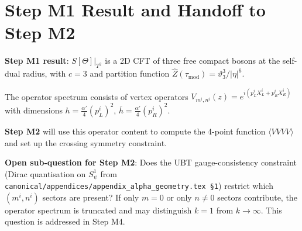 \documentclass[12pt,a4paper]{article}
\theoremstyle{definition}
\theoremstyle{remark}
\begin{document}
\section{Step M1 Result and Handoff to Step M2}
\label{sec:m1:result}

\begin{resultbox}
\textbf{Step M1 result}: $S[\Theta]|_{T^2}$ is a 2D CFT of three free compact
bosons at the self-dual radius, with $c = 3$ and partition function
$\hat{Z}(\tau_{\mathrm{mod}}) = \vartheta_3^3 / |\eta|^6$.

The operator spectrum consists of vertex operators
$V_{m^i,n^i}(z) = e^{i(p^i_L X^i_L + p^i_R X^i_R)}$
with dimensions $h = \frac{\alpha'}{4}(p_L^i)^2$,
$\bar{h} = \frac{\alpha'}{4}(p_R^i)^2$.

\textbf{Step M2} will use this operator content to compute the 4-point
function $\langle V V V V \rangle$ and set up the crossing symmetry constraint.
\end{resultbox}

\begin{gapbox}
\textbf{Open sub-question for Step M2}: Does the UBT gauge-consistency
constraint (Dirac quantisation on $S^1_\psi$ from
\texttt{canonical/appendices/appendix\_alpha\_geometry.tex \S1}) restrict which
$(m^i, n^i)$ sectors are present?  If only $m = 0$ or only $n \neq 0$ sectors
contribute, the operator spectrum is truncated and may distinguish $k = 1$
from $k \to \infty$.  This question is addressed in Step M4.
\end{gapbox}

\ifdefined\INCLUDEMODE
\else
  
\end{document}
